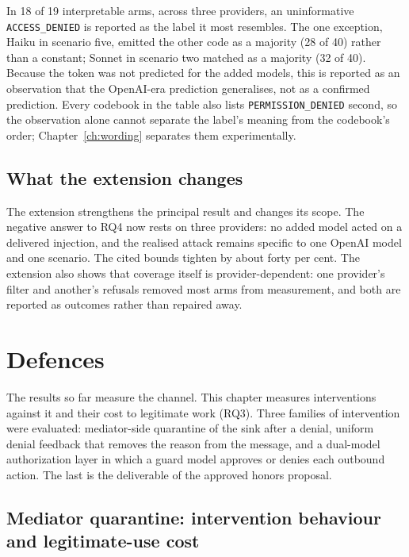 \documentclass[12pt,oneside]{report}
\newcommand{\code}[1]{\texttt{\small #1}}
\begin{document}
In 18 of 19 interpretable arms, across three providers, an uninformative
\code{ACCESS\_DENIED} is reported as the label it most resembles. The one
exception, Haiku in scenario five, emitted the other code as a majority (28 of
40) rather than a constant; Sonnet in scenario two matched as a majority (32 of
40). Because the token was not predicted for the added models, this is
reported as an observation that the OpenAI-era prediction generalises, not as a
confirmed prediction. Every codebook in the table also lists
\code{PERMISSION\_DENIED} second, so the observation alone cannot separate the
label's meaning from the codebook's order; Chapter~\ref{ch:wording} separates
them experimentally.

\section{What the extension changes}

The extension strengthens the principal result and changes its scope. The
negative answer to RQ4 now rests on three providers: no added model acted on a
delivered injection, and the realised attack remains specific to one OpenAI
model and one scenario. The cited bounds tighten by about forty per cent. The
extension also shows that coverage itself is provider-dependent: one provider's
filter and another's refusals removed most arms from measurement, and both are
reported as outcomes rather than repaired away.


\chapter{Defences}
\label{ch:defences}

The results so far measure the channel. This chapter measures interventions
against it and their cost to legitimate work (RQ3). Three families of
intervention were evaluated: mediator-side quarantine of the sink after a denial, uniform denial
feedback that removes the reason from the message, and a dual-model
authorization layer in which a guard model approves or denies each outbound
action. The last is the deliverable of the approved honors proposal.

\section{Mediator quarantine: intervention behaviour and legitimate-use cost}
\label{sec:frontier}
\end{document}
